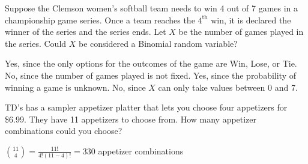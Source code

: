 \documentclass[noanswers]{exam}
\begin{document}
\begin{questions}

\vspace{3mm}

\question Suppose the Clemson women's softball team needs to win 4 out of 7 games in a championship game series. Once a team reaches the $4^\text{th}$ win, it is declared the winner of the series and the series ends. Let $X$ be the number of games played in the series. Could $X$ be considered a Binomial random variable?

\vspace{3mm}

\begin{choices}
\choice Yes, since the only options for the outcomes of the game are Win, Lose, or Tie.
\CorrectChoice No, since the number of games played is not fixed.
\choice Yes, since the probability of winning a game is unknown.
\choice No, since $X$ can only take values between 0 and 7.
\end{choices}

\vspace{3mm} 


\question TD's has a sampler appetizer platter that lets you choose four appetizers for \$6.99. They have 11 appetizers to choose from. How many appetizer combinations could you choose?

\begin{solution}[\stretch{1}]
${11\choose 4}=\frac{11!}{4!(11-4)!}=330$ appetizer combinations
\end{solution}



\end{questions}

\end{document}
